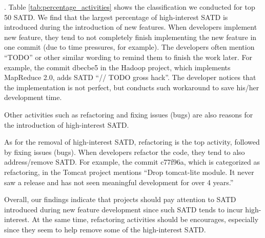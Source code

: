 \documentclass[10pt, conference]{IEEEtran}
\newcommand{\emad}[1]{{\color{red}{\textbf{Emad: [#1]}}}}
\newcommand{\smallsection}[1]{\vspace{1mm}\noindent {\bf #1}.\hspace{2mm}}
\newcommand{\revised}[1]{{\color{red}{#1}}}
\begin{document}


\smallsection{Results}
Table \ref{tab:percentage_activities} shows the classification we conducted for top 50 SATD. We find that the largest percentage of high-interest SATD is introduced during the introduction of new features. When developers implement new feature, they tend to not completely finish implementing the new feature in one commit (due to time pressures, for example). The developers often mention ``TODO'' or other similar wording to remind them to finish the work later. For example, the commit dbecbe5 in the Hadoop project, which implements MapReduce 2.0, adds SATD ``// TODO gross hack''. The developer notices that the implementation is not perfect, but conducts such workaround to save his/her development time.

Other activities such as refactoring and fixing issues (bugs) are also reasons for the introduction of high-interest SATD. \revised{Similar to the reason ``New Feature'', developers tend to not completely finish refactoring source code and fixing issues. For example, the commit 11303a4 in the JMeter project, which modifies logging output, adds SATD ``// TODO - report unused columns? // TODO - provide option to set unused variables?'' We also find that the commit 1378efc in the JMeter project, which fixes resizing in the ThreadGroupGui class, adds SATD ``// This won't work right if we remove components. But we don't, so I'm not going to worry about it right now.''}



As for the removal of high-interest SATD, refactoring is the top activity, followed by fixing issues (bugs). When developers refactor the code, they tend to also address/remove SATD. For example, the commit c77f96a, which is categorized as refactoring, in the Tomcat project mentions ``Drop tomcat-lite module. It never saw a release and has not seen meaningful development for over 4 years.''

Overall, our findings indicate that projects should pay attention to SATD introduced during new feature development since such SATD tends to incur high-interest. At the same time, refactoring activities should be encourages, especially since they seem to help remove some of the high-interest SATD.
\end{document}
